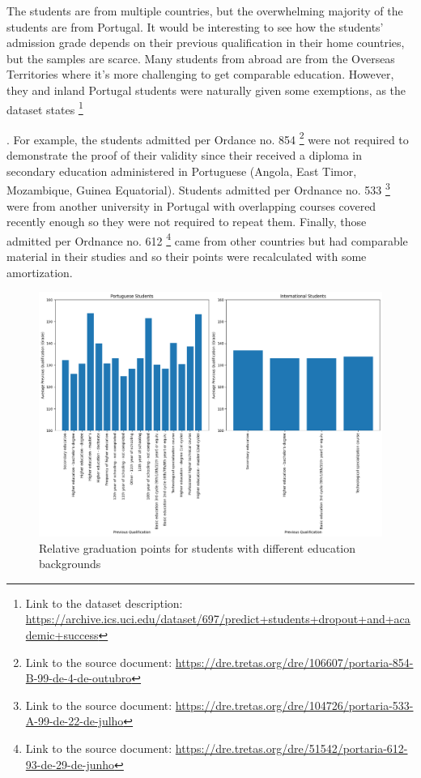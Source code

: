 \documentclass[
  letterpaper,
  DIV=11,
  numbers=noendperiod]{scrartcl}
\begin{document}
The students are from multiple countries, but the overwhelming majority
of the students are from Portugal. It would be interesting to see how
the students' admission grade depends on their previous qualification in
their home countries, but the samples are scarce. Many students from
abroad are from the Overseas Territories where it's more challenging to
get comparable education. However, they and inland Portugal students
were naturally given some exemptions, as the dataset states \footnote{Link
  to the dataset description:
  \url{https://archive.ics.uci.edu/dataset/697/predict+students+dropout+and+academic+success}}

. For example, the students admitted per Ordance no. 854 \footnote{Link
  to the source document:
  \url{https://dre.tretas.org/dre/106607/portaria-854-B-99-de-4-de-outubro}}
were not required to demonstrate the proof of their validity since their
received a diploma in secondary education administered in Portuguese
(Angola, East Timor, Mozambique, Guinea Equatorial). Students admitted
per Ordnance no. 533 \footnote{Link to the source document:
  \url{https://dre.tretas.org/dre/104726/portaria-533-A-99-de-22-de-julho}}
were from another university in Portugal with overlapping courses
covered recently enough so they were not required to repeat them.
Finally, those admitted per Ordnance no. 612 \footnote{Link to the
  source document:
  \url{https://dre.tretas.org/dre/51542/portaria-612-93-de-29-de-junho}}
came from other countries but had comparable material in their studies
and so their points were recalculated with some amortization.

\begin{figure}

{\centering \includegraphics{report_AzadhdhinNedalYunisAlFraijat_files/figure-pdf/fig-education-output-1.png}

}

\caption{\label{fig-education}Relative graduation points for students
with different education backgrounds}

\end{figure}
\end{document}
